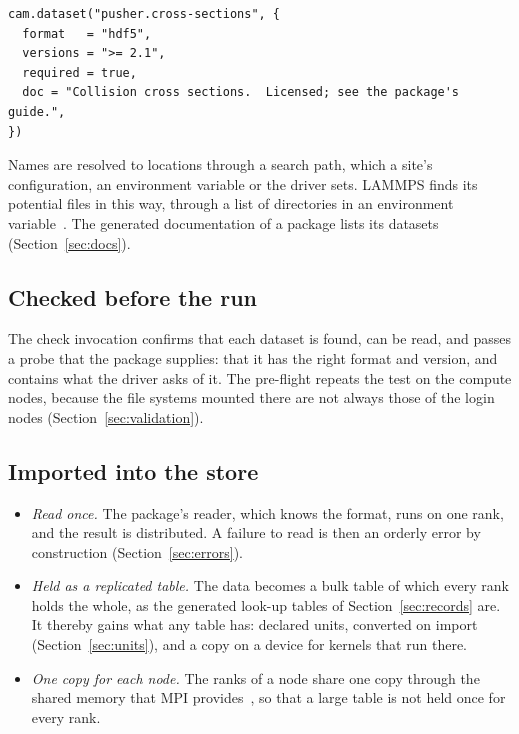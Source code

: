 \documentclass[11pt,a4paper]{article}
\begin{document}
\begin{lstlisting}[language={[5.3]Lua}]
cam.dataset("pusher.cross-sections", {
  format   = "hdf5",
  versions = ">= 2.1",
  required = true,
  doc = "Collision cross sections.  Licensed; see the package's guide.",
})
\end{lstlisting}

Names are resolved to locations through a search path, which a site's
configuration, an environment variable or the driver sets.  LAMMPS finds
its potential files in this way, through a list of directories in an
environment variable~\cite{lammpspaircoeff}.  The generated documentation
of a package lists its datasets (Section~\ref{sec:docs}).

\subsection{Checked before the run}

The check invocation confirms that each dataset is found, can be read, and
passes a probe that the package supplies: that it has the right format and
version, and contains what the driver asks of it.  The pre-flight repeats
the test on the compute nodes, because the file systems mounted there are
not always those of the login nodes (Section~\ref{sec:validation}).

\subsection{Imported into the store}

\begin{itemize}
  \item \emph{Read once.}  The package's reader, which knows the format,
        runs on one rank, and the result is distributed.  A failure to read
        is then an orderly error by construction
        (Section~\ref{sec:errors}).
  \item \emph{Held as a replicated table.}  The data becomes a bulk table of
        which every rank holds the whole, as the generated look-up tables
        of Section~\ref{sec:records} are.  It thereby gains what any table
        has: declared units, converted on import
        (Section~\ref{sec:units}), and a copy on a device for kernels that
        run there.
  \item \emph{One copy for each node.}  The ranks of a node share one copy
        through the shared memory that MPI provides~\cite{mpi50}, so that a
        large table is not held once for every rank.
\end{itemize}
\end{document}

